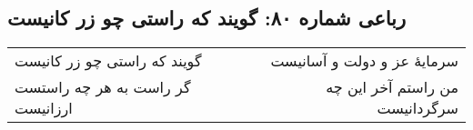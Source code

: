 \begin{center}
\section*{رباعی شماره ۸۰: گویند که راستی چو زر کانیست}
\label{sec:sh080}
\begin{longtable}{l p{0.5cm} r}
گویند که راستی چو زر کانیست
&&
سرمایهٔ عز و دولت و آسانیست
\\
گر راست به هر چه راستست ارزانیست
&&
من راستم آخر این چه سرگردانیست
\\
\end{longtable}
\end{center}
